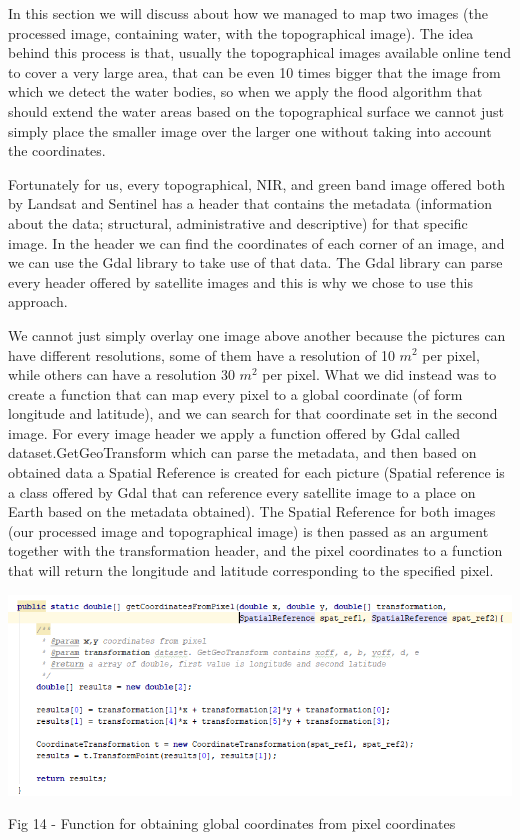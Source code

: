 \documentclass[12pt, a4paper]{report}
\begin{document}
\quad
In this section we will discuss about how we managed to map two images (the processed image, containing water, with the topographical image). The idea behind this process is that, usually the topographical images available online tend to cover a very large area, that can be even 10 times bigger that the image from which we detect the water bodies, so when we apply the flood algorithm that should extend the water areas based on the topographical surface we cannot just simply place the smaller image over the larger one without taking into account the coordinates. 
\par 

Fortunately for us, every topographical, NIR, and green band image offered both by Landsat and Sentinel has a header that contains the metadata (information about the data; structural, administrative and descriptive) for that specific image. In the header we can find the coordinates of each corner of an image, and we can use the Gdal library to take use of that data. The 
Gdal library can parse every header offered by satellite images and this is why we chose to use this approach. 
\par 

We cannot just simply overlay one image above another because the pictures can have different resolutions, some of them have a resolution of 10 $m^2$ per pixel, while others can have a resolution 30 $m^2$ per pixel. What we did instead was to create a function that can map every pixel to a global coordinate (of form longitude and latitude), and we can search for that coordinate set in the second image. For every image header we apply a function offered by Gdal called dataset.GetGeoTransform which can parse the metadata, and then based on obtained data a Spatial Reference is created for each picture (Spatial reference is a class offered by Gdal that can reference every satellite image to a place on Earth based on the metadata obtained). The Spatial Reference for both images (our processed image and topographical image) is then passed as an argument together with the transformation header, and the pixel coordinates to a function that will return the longitude and latitude corresponding to the specified pixel.

\bigskip
\includegraphics[scale=0.8, left]{java_coordinate_mapping.png}
\begin{center}
Fig 14 - Function for obtaining global coordinates from pixel coordinates
\end{center}
\par 
\end{document}
